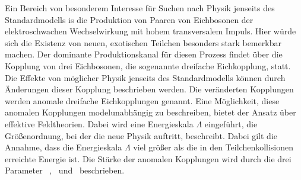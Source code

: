 Ein Bereich von besonderem Interesse für Suchen nach Physik jenseits des Standardmodells is die Produktion von Paaren von Eichbosonen der elektroschwachen Wechselwirkung mit hohem transversalem Impuls. Hier würde sich die Existenz von neuen, exotischen Teilchen besonders stark bemerkbar machen. Der dominante Produktionskanal für diesen Prozess findet über die Kopplung von drei Eichbosonen, die sogenannte dreifache Eichkopplung, statt. Die Effekte von möglicher Physik jenseits des Standardmodells können durch Änderungen dieser Kopplung beschrieben werden. Die veränderten Kopplungen werden anomale dreifache Eichkopplungen genannt. Eine Möglichkeit, diese anomalen Kopplungen modelunabhängig zu beschreiben, bietet der Ansatz über effektive Feldtheorien. Dabei wird eine Energieskala $\Lambda$ eingeführt, die Größenordnung, bei der die neue Physik auftritt, beschreibt. Dabei gilt die Annahme, dass die Energieskala $\Lambda$ viel größer als die in den Teilchenkollisionen erreichte Energie ist. Die Stärke der anomalen Kopplungen wird durch die drei Parameter \Tcwww \ , \Tccw \ und \Tcb \ beschrieben.